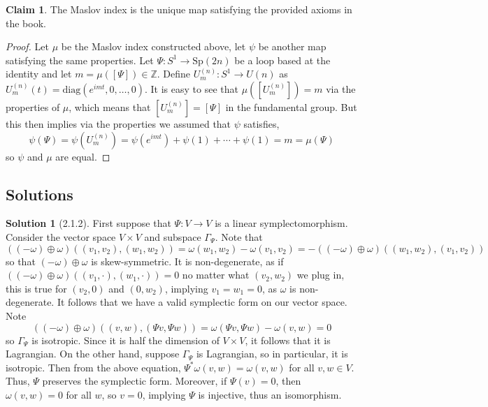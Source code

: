 \documentclass[aps,pra,showpacs,notitlepage,onecolumn,superscriptaddress,nofootinbib]{revtex4-1}
\theoremstyle{definition}
\newtheorem{claim}{Claim}[section]
\newtheorem{solution}{Solution}[section]
\begin{document}
\begin{claim}
  The Maslov index is the unique map satisfying the provided axioms in the book.
  \end{claim}
\begin{proof}
  Let $\mu$ be the Maslov index constructed above, let $\psi$ be another map satisfying the same properties. Let $\Psi : S^1 \rightarrow \text{Sp}(2n)$ be a loop based at the identity and let
  $m = \mu([\Psi]) \in \mathbb{Z}$. Define $U_{m}^{(n)} : S^1 \rightarrow U(n)$ as $U_m^{(n)}(t) = \text{diag}(e^{i m t}, 0, \dots, 0)$. It is easy to see that $\mu([U_m^{(n)}]) = m$ via the properties of $\mu$,
  which means that $[U_m^{(n)}] = [\Psi]$ in the fundamental group. But this then implies via the properties we assumed that $\psi$ satisfies,
  \begin{equation}
    \psi(\Psi) = \psi(U_m^{(n)}) = \psi(e^{i m t}) + \psi(1) + \cdots + \psi(1) = m = \mu(\Psi)
    \end{equation}
  so $\psi$ and $\mu$ are equal.
\end{proof}

\subsection{Solutions}

\begin{solution}[2.1.2]
  First suppose that $\Psi : V \rightarrow V$ is a linear symplectomorphism. Consider the vector space $V \times V$ and subspace $\Gamma_{\Psi}$. Note that
\begin{equation}
((-\omega) \oplus \omega)((v_1, v_2), (w_1, w_2)) = \omega(w_1, w_2) - \omega(v_1, v_2) = - ((-\omega) \oplus \omega)((w_1, w_2), (v_1, v_2))
\end{equation}
so that $(-\omega) \oplus \omega$ is skew-symmetric. It is non-degenerate, as if $((-\omega) \oplus \omega)((v_1, \cdot), (w_1, \cdot)) = 0$ no matter
what $(v_2, w_2)$ we plug in, this is true for $(v_2, 0)$ and $(0, w_2)$, implying $v_1 = w_1 = 0$, as $\omega$ is non-degenerate. It follows that
we have a valid symplectic form on our vector space. Note
\begin{equation}
((-\omega) \oplus \omega)((v, w), (\Psi v, \Psi w)) = \omega(\Psi v, \Psi w) - \omega(v, w) = 0
\end{equation}
so $\Gamma_{\Psi}$ is isotropic. Since it is half the dimension of $V \times V$, it follows that it is Lagrangian. On the other hand, suppose $\Gamma_{\Psi}$
is Lagrangian, so in particular, it is isotropic. Then from the above equation, $\Psi^{*} \omega(v, w) = \omega(v, w)$ for all $v, w \in V$. Thus, $\Psi$ preserves the symplectic form.
Moreover, if $\Psi(v) = 0$, then $\omega(v, w) = 0$ for all $w$, so $v = 0$, implying $\Psi$ is injective, thus an isomorphism.
  \end{solution}
\end{document}
